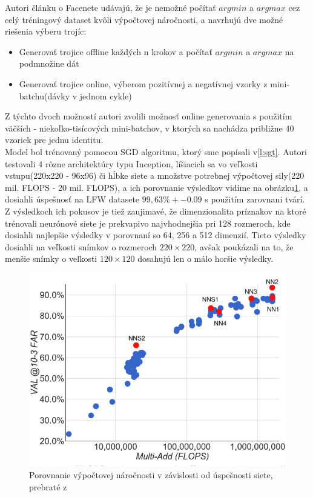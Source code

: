 Autori článku\cite{schroff2015facenet} o Facenete udávajú, že je nemožné počítať $ argmin $ a $ argmax $ cez celý tréningový dataset kvôli výpočtovej náročnosti, a navrhujú dve možné riešenia výberu trojíc:

\begin{itemize}
	\item Generovať trojice offline každých n krokov a počítať $ argmin $ a $ argmax $ na podmnožine dát
	\item Generovať trojice online, výberom pozitívnej a negatívnej vzorky z mini-batchu(dávky v jednom cykle) 
\end{itemize}

\indent Z týchto dvoch možností autori zvolili možnosť online generovania s použitím väčších - niekoľko-tisícových mini-batchov, v ktorých sa nachádza približne 40 vzoriek pre jednu identitu. \\

\indent Model bol trénovaný pomocou SGD algoritmu, ktorý sme popísali v\ref{l:sgt}.
Autori testovali 4 rôzne architektúry typu Inception, líšiacich sa vo veľkosti vstupu(220x220 - 96x96) či hĺbke siete a množstve potrebnej výpočtovej sily(220 mil. FLOPS - 20 mil. FLOPS), a ich porovnanie výsledkov vidíme na obrázku\ref{fig:facenetflops}, a dosiahli úspešnosť na LFW datasete $ 99,63\% +- 0.09 $ s použitím zarovnani tvárí.
Z výsledkoch ich pokusov je tiež zaujimavé, že dimenzionalita príznakov na ktoré trénovali neurónové siete je prekvapivo najvhodnejšia pri 128 rozmeroch, kde dosiahli najlepšie výsledky v porovnaní so 64, 256 a 512 dimenzií.
Tieto výsledky dosiahli na veľkosti snímkov o rozmeroch $ 220 \times 220 $, avšak poukázali na to, že menšie snímky o veľkosti $ 120 \times 120 $ dosahujú len o málo horšie výsledky.

\begin{figure}[H]
	\centering
	\includegraphics[width=.75\linewidth]{img/facenetflops}
	\caption{Porovnanie výpočtovej náročnosti v závislosti od úspešnosti siete, prebraté z\cite[s.~5]{schroff2015facenet}}
	\label{fig:facenetflops}
\end{figure}

